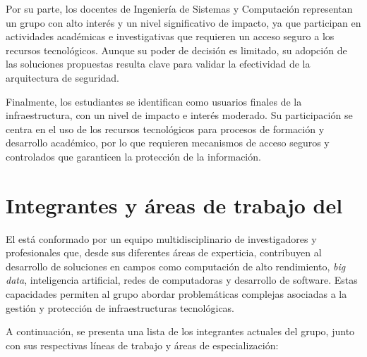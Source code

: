 Por su parte, los docentes de Ingeniería de Sistemas y Computación representan un grupo con alto interés y un nivel significativo de 
impacto, ya que participan en actividades académicas e investigativas que requieren un acceso seguro a los recursos tecnológicos. 
Aunque su poder de decisión es limitado, su adopción de las soluciones propuestas resulta clave para validar la efectividad de la 
arquitectura de seguridad.

Finalmente, los estudiantes se identifican como usuarios finales de la infraestructura, con un nivel de impacto e interés moderado. Su 
participación se centra en el uso de los recursos tecnológicos para procesos de formación y desarrollo académico, por lo que requieren 
mecanismos de acceso seguros y controlados que garanticen la protección de la información.



\section{Integrantes y áreas de trabajo del \GRID}
El \GRID está conformado por un equipo multidisciplinario de investigadores y profesionales que, desde sus diferentes áreas de 
experticia, contribuyen al desarrollo de soluciones en campos como computación de alto rendimiento, \textit{big data}, inteligencia 
artificial, redes de computadoras y desarrollo de software. Estas capacidades permiten al grupo abordar problemáticas complejas 
asociadas a la gestión y protección de infraestructuras tecnológicas.

A continuación, se presenta una lista de los integrantes actuales del grupo, junto con sus respectivas líneas de trabajo y áreas de 
especialización:


